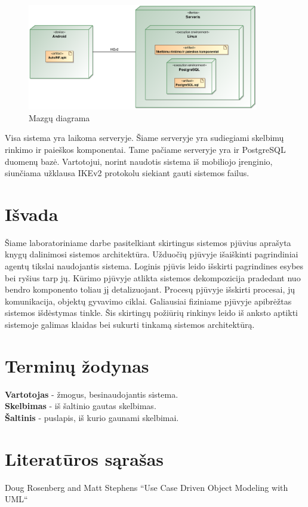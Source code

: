 \documentclass[12pt]{article}
\begin{document}
	\begin{figure}[h]
		\begin{center}
			\includegraphics[width=0.9\textwidth]{Mazgai.eps}
			\caption{Mazgų diagrama\label{Cube}}
		\end{center}
	\end{figure}
	
	Visa sistema yra laikoma serveryje. Šiame serveryje yra sudiegiami skelbimų rinkimo ir paieškos komponentai. Tame pačiame serveryje yra ir PostgreSQL duomenų bazė. Vartotojui, norint naudotis sistema iš mobiliojo įrenginio, siunčiama užklausa IKEv2 protokolu siekiant gauti sistemos failus.
	\pagebreak
	
	
	\section*{Išvada}
	Šiame laboratoriniame darbe pasitelkiant skirtingus sistemos pjūvius aprašyta knygų dalinimosi sistemos architektūra. Užduočių pjūvyje išaiškinti pagrindiniai agentų tikslai naudojantis sistema. Loginis pjūvis leido išskirti pagrindines esybes bei ryšius tarp jų. Kūrimo pjūvyje atlikta sistemos dekompozicija pradedant nuo bendro komponento toliau jį detalizuojant. Procesų pjūvyje išskirti procesai, jų komunikacija, objektų gyvavimo ciklai. Galiausiai fiziniame pjūvyje apibrėžtas sistemos išdėstymas tinkle. Šis skirtingų požiūrių rinkinys leido iš anksto aptikti sistemoje galimas klaidas bei sukurti tinkamą sistemos architektūrą.
	\pagebreak

	\section*{Terminų žodynas}
	
	\bigskip
	\textbf{Vartotojas} - žmogus, besinaudojantis sistema.\\
	
	\textbf{Skelbimas} - iš šaltinio gautas skelbimas.\\
	
	\textbf{Šaltinis} - puslapis, iš kurio gaunami skelbimai.\\
	\pagebreak

	\section*{Literatūros sąrašas}
	
	Doug Rosenberg and Matt Stephens “Use Case Driven Object Modeling with UML“
\end{document}
